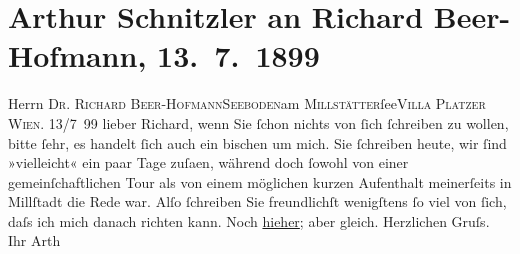 

         
         \renewcommand{\erwaehntePersonen}{Personen: Richard Beer-Hofmann}
         \renewcommand{\erwaehnteOrte}{Orte: IX., Alsergrund, Millstatt, Millstätter See, Seeboden, Villa Platzer, Wien}
         \renewcommand{\erwaehnteWerke}{}
               \section[Arthur Schnitzler an Richard Beer-Hofmann, 13. 7. 1899]{ Arthur Schnitzler an Richard Beer-Hofmann, 13. 7. 1899}\nopagebreak{}\rehead{ }\begin{ledgroupsized}[t]{13cm}\normalsize\beginnumbering{} \toendnotes[C]{\smallbreak\pagebreak[2]} 
\pstart{}{\pb}Herrn \textsc{Dr. Richard
                     Beer-Hofmann}\pend{}\pstart{}\textsc{Seeboden}\pend{}\pstart{}am \textsc{Millstätter}ſee\pend{}\pstart{}\textsc{Villa Platzer}\pend{}{\bigskip}\pstart
           \raggedleft{}{\pb}\textsc{Wien}. 13/7 99\pend
           \pstart
           lieber Richard, wenn Sie ſchon nichts von ſich ſchreiben zu wollen,
               bitte ſehr, es handelt ſich auch ein bischen um mich. Sie ſchreiben heute, wir ſind
               »vielleicht« ein paar Tage zuſa{\geminationm}en, während doch ſowohl
               von einer gemeinſchaftlichen Tour als von einem möglichen kurzen Aufenthalt
               meinerſeits in Millſtadt die Rede war. Alſo
               ſchreiben Sie freundlichſt wenigſtens ſo viel von ſich, daſs ich mich danach richten
               kann.\pend
           \pstart
           Noch \uline{hieher}; aber gleich.\pend
           \pstart Herzlichen Gruſs. Ihr \spacefill\mbox{Arth}\pend{}
         
         \endnumbering{}\end{ledgroupsized}  \newcommand{\dateiname}{L00939}\newcommand{\titel}{Arthur Schnitzler an Richard Beer-Hofmann, 13. 7. 1899}\newcommand{\editorInnen}{Martin Anton Müller und Gerd-Hermann Susen}
      